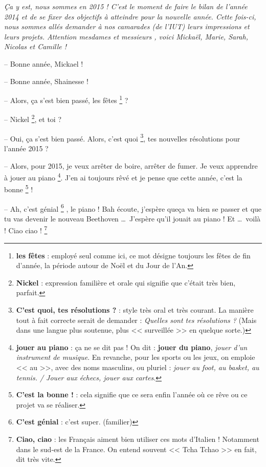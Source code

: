 \documentclass[11pt, french]{report}
\begin{document}
\textit{Ça y est, nous sommes en 2015 ! C’est le moment de faire le bilan
  de l’année 2014 et de se fixer des objectifs à atteindre pour la nouvelle
  année. Cette fois-ci, nous sommes allés demander à nos camarades (de l’IUT)
  leurs impressions et leurs projets. Attention mesdames et messieurs ,
  voici Mickaël, Marie, Sarah, Nicolas et Camille !}

\vfill

-- Bonne année, Mickael !

-- Bonne année, Shainesse !

-- Alors, ça s'est bien passé, les fêtes \footnote{\textbf{les fêtes} : employé
  seul comme ici, ce mot désigne toujours les fêtes de fin d'année, la période
  autour de Noël et du Jour de l'An.} ?

-- Nickel \footnote{\textbf{Nickel} : expression familière et orale qui
  signifie que c'était très bien, parfait.}, et toi ?

-- Oui, ça s'est bien passé. Alors, c'est quoi
\footnote{\textbf{C'est quoi, tes résolutions ?} : style très oral et très
  courant. La manière tout à fait correcte serait de demander : \textit{Quelles
  sont tes résolutions ?} (Mais dans une langue plus soutenue, plus
<< surveillée >> en quelque sorte.)}, tes nouvelles résolutions pour l'année 2015 ?

-- Alors, pour 2015, je veux arrêter de boire, arrêter de fumer. Je veux
apprendre à jouer au piano \footnote{\textbf{jouer au piano} : ça ne se dit
  pas ! On dit : \textbf{jouer du piano}, \textit{jouer d'un instrument de
    musique}. En revanche, pour les sports ou les jeux, on emploie << au >>,
avec des noms masculins, ou pluriel : \textit{jouer au foot, au basket, au
tennis. / Jouer aux échecs, jouer aux cartes}.}. J'en ai toujours rêvé et je
pense que cette année, c'est la bonne \footnote{\textbf{C'est la bonne !} :
cela signifie que ce sera enfin l'année où ce rêve ou ce projet va se
réaliser.} !

-- Ah, c'est génial \footnote{\textbf{C'est génial} : c'est super. (familier)}
, le piano ! Bah écoute, j'espère queça va bien se passer et que tu vas
devenir le nouveau Beethoven \ldots\ J'espère qu'il jouait au piano
\footmark[4] ! Et \ldots\ voilà ! Ciao ciao !
\footnote{\textbf{Ciao, ciao} : les Français aiment bien utiliser ces mots
  d'Italien ! Notamment dans le sud-est de la France. On entend souvent
<< Tcha Tchao >> en fait, dit très vite.}
\end{document}
